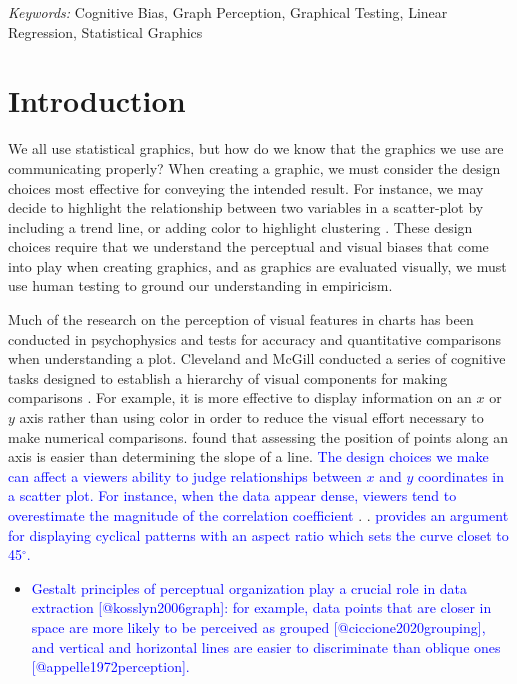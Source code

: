 \documentclass[12pt]{article}
\begin{document}
\noindent%
{\it Keywords:} Cognitive Bias, Graph Perception, Graphical
Testing, Linear Regression, Statistical Graphics
\vfill

\newpage
{} %

\hypertarget{introduction}{%
\section{Introduction}\label{introduction}}

We all use statistical graphics, but how do we know that the graphics we
use are communicating properly? When creating a graphic, we must
consider the design choices most effective for conveying the intended
result. For instance, we may decide to highlight the relationship
between two variables in a scatter-plot by including a trend line, or
adding color to highlight clustering \citep{vanderplas2017clusters}.
These design choices require that we understand the perceptual and
visual biases that come into play when creating graphics, and as
graphics are evaluated visually, we must use human testing to ground our
understanding in empiricism.

Much of the research on the perception of visual features in charts has
been conducted in psychophysics and tests for accuracy and quantitative
comparisons when understanding a plot. Cleveland and McGill conducted a
series of cognitive tasks designed to establish a hierarchy of visual
components for making comparisons \citep{cleveland1984graphical}. For
example, it is more effective to display information on an \(x\) or
\(y\) axis rather than using color in order to reduce the visual effort
necessary to make numerical comparisons. \citet{cleveland1985graphical}
found that assessing the position of points along an axis is easier than
determining the slope of a line.
{\textcolor{blue}{The design choices we make can affect a viewers ability to judge relationships between $x$ and $y$ coordinates in a scatter plot. For instance, when the data appear dense, viewers tend to overestimate the magnitude of the correlation coefficient}}
\citep{cleveland1982variables, lauer1989density}.
\citet{cleveland1993visualizing}.
{\textcolor{blue}{provides an argument for displaying cyclical patterns with an aspect ratio which sets the curve closet to 45$^{\circ}$.}}

\begin{itemize}
\item
  {\textcolor{blue}{Gestalt principles of perceptual organization play a crucial role in data extraction [@kosslyn2006graph]: for example, data points that are closer in space are more likely to be perceived as grouped [@ciccione2020grouping], and vertical and horizontal lines are easier to discriminate than oblique ones [@appelle1972perception].}}
\end{itemize}
\end{document}

